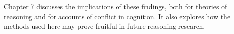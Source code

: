 Chapter 7 discusses the implications of these findings,
both for theories of reasoning and for accounts of conflict in cognition.
It also explores how the methods used here
may prove fruitful in future reasoning research.






